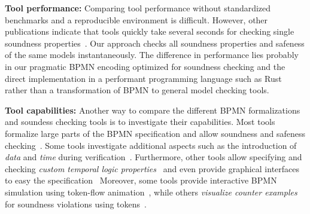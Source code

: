 \documentclass[runningheads]{llncs}
\begin{document}
\textbf{Tool performance:}
Comparing tool performance without standardized benchmarks and a reproducible environment is difficult.
However, other publications indicate that tools quickly take several seconds for checking single soundness properties~\cite{corradiniFormalApproachAnalysis2021,houhouFirstOrderLogicVerification2022,krauterHigherorderTransformationApproach2023}.
Our approach checks all soundness properties and safeness of the same models instantaneously.
The difference in performance lies probably in our pragmatic BPMN encoding optimized for soundness checking and the direct implementation in a performant programming language such as Rust rather than a transformation of BPMN to general model checking tools.

\textbf{Tool capabilities:}
Another way to compare the different BPMN formalizations and soundess checking tools is to investigate their capabilities.
Most tools formalize large parts of the BPMN specification and allow soundness and safeness checking~\cite{corradiniFormalApproachAnalysis2021,houhouFirstOrderLogicVerification2022,krauterFormalizationAnalysisBPMN2023,krauterHigherorderTransformationApproach2023}.
Some tools investigate additional aspects such as the introduction of \textit{data} and \textit{time} during verification~\cite{corradiniFormalisingAnimatingMultiple2022,houhouFirstOrderLogicVerification2022}.
Furthermore, other tools allow specifying and checking \textit{custom temporal logic properties}~\cite{corradiniFormalApproachAnalysis2021,krauterFormalizationAnalysisBPMN2023} and even provide graphical interfaces to easy the specification~\cite{krauterHigherorderTransformationApproach2023}
Moreover, some tools provide interactive BPMN simulation using token-flow animation~\cite{camundaservicesgmbhBpmnjsTokenSimulation2024,corradiniFormalisingAnimatingMultiple2022}, while others \textit{visualize counter examples} for soundness violations using tokens~\cite{houhouFirstOrderLogicVerification2022}.
\end{document}
